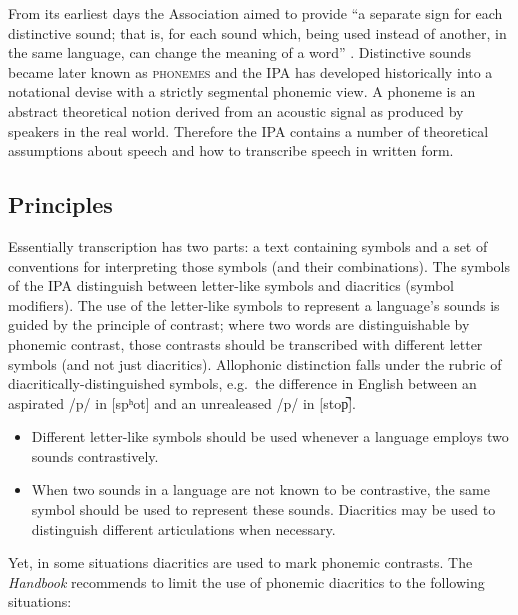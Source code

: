\noindent From its earliest days the Association aimed to provide ``a separate sign for
each distinctive sound; that is, for each sound which, being used instead of
another, in the same language, can change the meaning of a word''
\citep[27]{IPA1999}. Distinctive sounds became later known as \textsc{phonemes}
and the IPA has developed historically into a notational devise with a strictly
segmental phonemic view. A phoneme is an abstract theoretical notion derived
from an acoustic signal as produced by speakers in the real world. Therefore the
IPA contains a number of theoretical assumptions about speech and how to
transcribe speech in written form. 

\subsection*{Principles}
\label{IPAprinciples}

Essentially transcription has two parts: a text containing symbols and a set 
of conventions for interpreting those symbols (and their combinations). 
The symbols of the IPA distinguish between letter-like symbols and
diacritics (symbol modifiers). The use of the letter-like symbols to represent 
a language's sounds is guided by the principle of contrast; where two words 
are distinguishable by phonemic contrast, those contrasts should be transcribed 
with different letter symbols (and not just diacritics). Allophonic distinction 
falls under the rubric of diacritically-distinguished symbols, e.g.\ the 
difference in English between an aspirated /p/ in [spʰot] and 
an unrealeased /p/ in [stop̚]. 

\begin{itemize}

	\item Different letter-like symbols should be used whenever
          a language employs two sounds contrastively.
	\item When two sounds in a language are not known to be contrastive, the same
          symbol should be used to represent these sounds. Diacritics may
          be used to distinguish different articulations when necessary.
\end{itemize}          
          
\noindent Yet, in some situations diacritics are used to mark phonemic
contrasts. The \textit{Handbook} recommends to limit the use of phonemic
diacritics to the following situations: 

